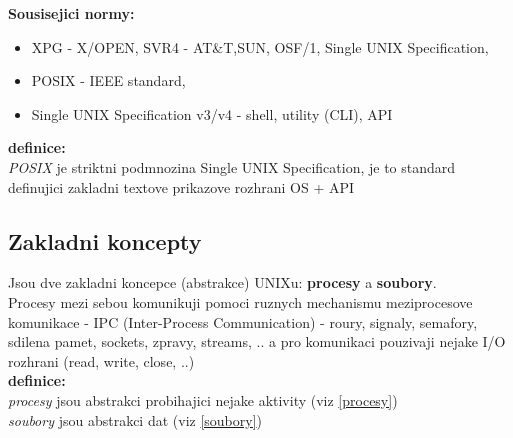 \documentclass[a4paper, 11pt]{article}
\begin{document}
\noindent\textbf{Sousisejici normy:}
\begin{itemize}
    \item XPG - X/OPEN, SVR4 - AT\&T,SUN, OSF/1, Single UNIX Specification,
    \item POSIX - IEEE standard,
    \item Single UNIX Specification v3/v4 - shell, utility (CLI), API \\
\end{itemize}

\noindent\textbf{definice:} \\[0.5em]
\textit{POSIX} je striktni podmnozina Single UNIX Specification, je to standard definujici zakladni textove prikazove rozhrani OS + API \\[1em]

\subsection{Zakladni koncepty}
Jsou dve zakladni koncepce (abstrakce) UNIXu: \textbf{procesy} a \textbf{soubory}. \\

\noindent Procesy mezi sebou komunikuji pomoci ruznych mechanismu meziprocesove komunikace - IPC (Inter-Process Communication) - roury, signaly, semafory, sdilena pamet, sockets, zpravy, streams, .. a pro komunikaci pouzivaji nejake I/O rozhrani (read, write, close, ..) \\

\noindent\textbf{definice:} \\[0.5em]
\textit{procesy} jsou abstrakci probihajici nejake aktivity (viz \ref{procesy})\\[0.2em]
\textit{soubory} jsou abstrakci dat (viz \ref{soubory}) \\[1em]

\newpage
\end{document}
